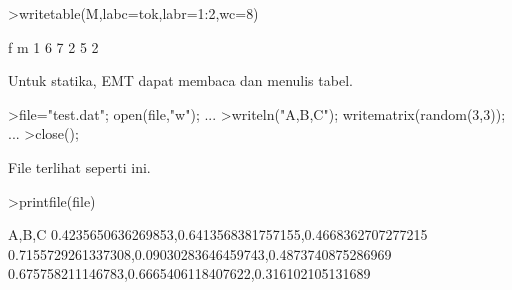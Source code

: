 \documentclass[a4paper,10pt]{article}
\begin{document}
\begin{eulernotebook}
\begin{eulercomment}
\begin{eulercomment}
\begin{eulercomment}
\begin{eulercomment}
\begin{eulercomment}
\begin{eulercomment}
\begin{eulercomment}
\begin{eulercomment}
\begin{eulercomment}
\begin{eulercomment}
\begin{eulercomment}
\begin{eulercomment}
\begin{eulercomment}
\begin{eulercomment}
\begin{eulercomment}
\begin{eulercomment}
\begin{eulercomment}
\begin{eulercomment}
\begin{eulercomment}
\begin{eulercomment}
\begin{eulercomment}
\begin{eulercomment}
\begin{eulercomment}
\begin{eulercomment}
\begin{eulerprompt}
>writetable(M,labc=tok,labr=1:2,wc=8)
\end{eulerprompt}
\begin{euleroutput}
                 f       m
         1       6       7
         2       5       2
\end{euleroutput}
\begin{eulercomment}
Untuk statika, EMT dapat membaca dan menulis tabel.
\end{eulercomment}
\begin{eulerprompt}
>file="test.dat"; open(file,"w"); ...
>writeln("A,B,C"); writematrix(random(3,3)); ...
>close();
\end{eulerprompt}
\begin{eulercomment}
File terlihat seperti ini.
\end{eulercomment}
\begin{eulerprompt}
>printfile(file)
\end{eulerprompt}
\begin{euleroutput}
  A,B,C
  0.4235650636269853,0.6413568381757155,0.4668362707277215
  0.7155729261337308,0.09030283646459743,0.4873740875286969
  0.675758211146783,0.6665406118407622,0.316102105131689
  

\end{euleroutput}
\end{eulercomment}
\end{eulercomment}
\end{eulercomment}
\end{eulercomment}
\end{eulercomment}
\end{eulercomment}
\end{eulercomment}
\end{eulercomment}
\end{eulercomment}
\end{eulercomment}
\end{eulercomment}
\end{eulercomment}
\end{eulercomment}
\end{eulercomment}
\end{eulercomment}
\end{eulercomment}
\end{eulercomment}
\end{eulercomment}
\end{eulercomment}
\end{eulercomment}
\end{eulercomment}
\end{eulercomment}
\end{eulercomment}
\end{eulercomment}
\end{eulernotebook}
\end{document}
